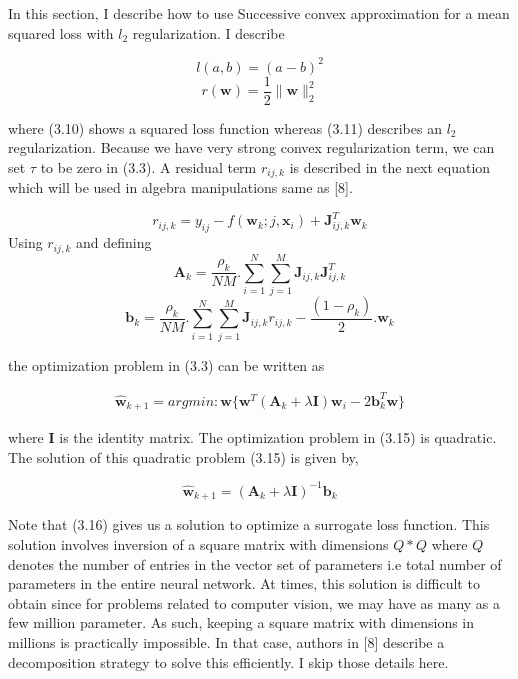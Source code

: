 In this section, I describe how to use Successive convex approximation for a mean squared loss with $l_2$ regularization. I describe
 
\begin{equation}
l(a,b) = (a-b)^{2} 
\end{equation}
\begin{equation}
r(\textbf{w}) = \frac{1}{2}\|\textbf{w}\|_2^2
\end{equation}

where (3.10) shows a squared loss function whereas (3.11) describes an $l_2$ regularization.
Because we have very strong convex regularization term, we can set $\tau$ to be zero in (3.3). A residual term $r_{ij,k}$ is described in the next equation which will be used in algebra manipulations same as [8].

\begin{equation}
r_{ij,k} = y_{ij} - f(\textbf{w}_k;j,\textbf{x}_i) + \textbf{J}_{ij,k}^T \textbf{w}_k
\end{equation} 
Using $r_{ij,k}$ and defining 
\begin{equation}
\textbf{A}_k = \frac{\rho_k}{NM}. \sum_{i=1}^{N} \sum_{j=1}^{M} \textbf{J}_{ij,k} \textbf{J}_{ij,k}^T
\end{equation}
\begin{equation}
\textbf{b}_k = \frac{\rho_k}{NM}. \sum_{i=1}^{N} \sum_{j=1}^{M} \textbf{J}_{ij,k} r_{ij,k} - \frac{(1-\rho_k)}{2}. \textbf{w}_k
\end{equation}

the optimization problem in (3.3) can be written as

\begin{equation}
\begin{aligned}
\hat{\textbf{w}}_{k+1} = argmin : \textbf{w}  \lbrace \textbf{w}^T \left( \textbf{A}_k + \lambda \textbf{I} \right) \textbf{w}_i -2 \textbf{b}_k^T \textbf{w}  \rbrace
\end{aligned}
\end{equation}

where $\textbf{I}$ is the identity matrix.  The optimization problem in (3.15) is quadratic. The solution of this quadratic problem (3.15) is given by,

\begin{equation}
\hat{\textbf{w}}_{k+1} = \left( \textbf{A}_k + \lambda \textbf{I} \right)^{-1} \textbf{b}_k
\end{equation}

Note that (3.16) gives us a solution to optimize a surrogate loss function. This solution involves inversion of a square matrix with dimensions $Q*Q$ where $Q$ denotes the number of entries in the vector set of parameters i.e total number of parameters in the entire neural network. At times, this solution is difficult to obtain since for problems related to computer vision, we may have as many as a few million parameter. As such, keeping a square matrix with dimensions in millions is practically impossible. In that case, authors in [8] describe a decomposition strategy to solve this efficiently. I skip those details here. 


